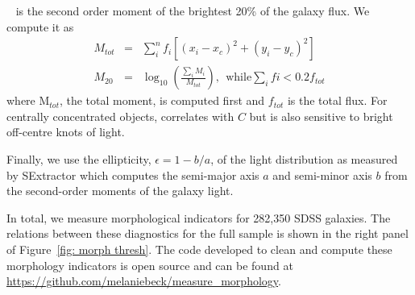 ~\citep{Lotz2004} is the second order moment of the brightest 20\% of the galaxy flux. We compute it as
\begin{eqnarray}
 M_{tot} & = & \sum_i^nf_i[(x_i-x_c)^2 + (y_i-y_c)^2]  \\
 M_{20} & = & \log_{10} (\frac{\sum_iM_i}{M_{tot}}), ~~\textrm{while} \sum_ifi < 0.2f_{tot}
\end{eqnarray}
where M$_{tot}$, the total moment, is computed first and $f_{tot}$ is the total flux. For centrally concentrated objects,  correlates with $C$ but is also sensitive to bright off-centre knots of light. 

Finally, we use the ellipticity, $\epsilon = 1 - b/a$, of the light distribution as measured by SExtractor which computes the semi-major axis $a$ and semi-minor axis $b$ from the second-order moments of the galaxy light.  

In total, we measure morphological indicators for 282,350 SDSS galaxies. The relations between these diagnostics for the full sample is shown in the right panel of Figure~\ref{fig: morph thresh}. The code developed to clean and compute these morphology indicators is open source and can be found at \url{https://github.com/melaniebeck/measure_morphology}.


